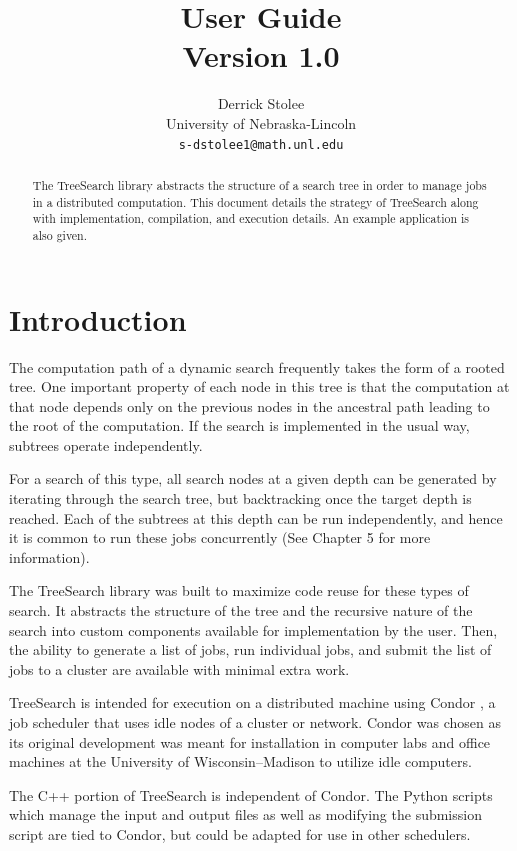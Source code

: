 \documentclass[11pt]{article}
\title{{\TreeSearch} User Guide\\ {\large Version 1.0}}
\author{Derrick Stolee \\ 
	University of Nebraska-Lincoln\\ 
	\texttt{s-dstolee1@math.unl.edu}
       }
\def\TreeSearch{{TreeSearch}}
\begin{document}
\maketitle
\vspace{-.3in}
\begin{abstract}
	The {\TreeSearch} library abstracts the structure of a search tree
		in order to manage jobs in a distributed computation.
	This document details the strategy of {\TreeSearch} along with
		implementation, compilation, and execution details.
	An example application is also given.
\end{abstract}

\section{Introduction}
\label{sec:Introduction}

The computation path of a dynamic search frequently takes the form of a rooted tree.
One important property of each node in this tree is that the computation at that
	node depends only on the previous nodes in the ancestral path leading
	to the root of the computation.
If the search is implemented in the usual way, subtrees operate independently.

For a search of this type, all search nodes at a given depth 
	can be generated by iterating through the search tree, but 
	backtracking once the target depth is reached.
Each of the subtrees at this depth can be run independently,
	and hence it is common to run these jobs concurrently 
	(See \cite{ClassificationAlgorithms} Chapter 5 for more information).

The {\TreeSearch} library was built to maximize code reuse for these types of search.
It abstracts the structure of the tree and the recursive nature of the search into
	custom components available for implementation by the user.
Then, the ability to generate a list of jobs, run individual jobs, and submit the list
	of jobs to a cluster are available with minimal extra work.
	
{\TreeSearch} is intended for execution 
	on a distributed machine using
	Condor \cite{condor-practice},
	a job scheduler that uses idle nodes of a cluster or network.
Condor was chosen as its original development was meant for
	installation in computer labs and office machines 
	at the University of Wisconsin--Madison
	to utilize idle computers.
	
The C++ portion of {\TreeSearch} 
	is independent of Condor.
The Python scripts which manage the input and output files
	as well as modifying the submission script are
	tied to Condor, but 
	could be adapted for use in other schedulers.
\end{document}
